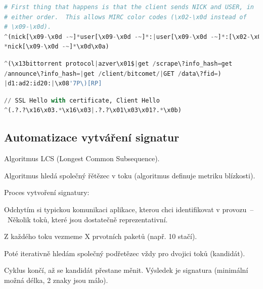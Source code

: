 
\noindent\begin{minipage}{\linewidth}
    \begin{lstlisting}[language=Python, caption={Příklad signatury pro detekci IRC. Pomocí regulárního výrazu je specifikována kostra řetězce.}]
# First thing that happens is that the client sends NICK and USER, in
# either order.  This allows MIRC color codes (\x02-\x0d instead of
# \x09-\x0d).
^(nick[\x09-\x0d -~]*user[\x09-\x0d -~]*:|user[\x09-\x0d -~]*:[\x02-\x0d -~]
*nick[\x09-\x0d -~]*\x0d\x0a)
\end{lstlisting}
\end{minipage}

\noindent\begin{minipage}{\linewidth}
    \begin{lstlisting}[language=Python, caption={Příklad signatury pro detekci BitTorrentu. Signatura je založená na klíčových slovech.}]
^(\x13bittorrent protocol|azver\x01$|get /scrape\?info_hash=get
/announce\?info_hash=|get /client/bitcomet/|GET /data\?fid=)
|d1:ad2:id20:|\x08'7P\)[RP]
\end{lstlisting}
\end{minipage}

\noindent\begin{minipage}{\linewidth}
    \begin{lstlisting}[language=Python, caption={Příklad signatury pro detekci SSL provozu. Detekce Client Hello paketu, kdy se vyměňují informace o šifrování.}]
// SSL Hello with certificate, Client Hello
^(.?.?\x16\x03.*\x16\x03|.?.?\x01\x03\x01?.*\x0b)
\end{lstlisting}
\end{minipage}

\subsection*{Automatizace vytváření signatur}

\begin{compactitem}
    \item Algoritmus LCS (Longest Common Subsequence).
    \item Algoritmus hledá  společný řětězec v toku (algoritmus definuje metriku blízkosti).
    \item Proces vytvoření signatury: \begin{compactitem}
        \item Odchytím si typickou komunikaci aplikace, kterou chci identifikovat v provozu~--~Několik toků, které jsou dostatečně reprezentativní.
        \item Z každého toku vezmeme X prvotních paketů (např. 10 stačí).
        \item Poté iterativně hledám  společný podřetězec vždy pro dvojici toků (kandidát).
        \item Cyklus končí, až se kandidát přestane měnit. Výsledek je signatura (minimální možná délka, 2 znaky jsou málo).
    \end{compactitem}
\end{compactitem}

